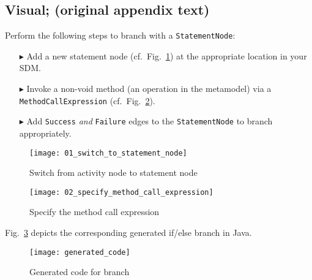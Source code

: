 \clearpage
\hypertarget{conBran vis}{}
\subsection{Visual; (original appendix text)}
\visHeader

Perform the following steps to branch with a \texttt{StatementNode}:
\begin{enumerate}
\item[$\blacktriangleright$] Add a new statement node (cf.~Fig.~\ref{fig:cond_statement_node}) at the appropriate location in your SDM.
\item[$\blacktriangleright$] Invoke a non-void method (an operation in the metamodel) via a \texttt{MethodCallExpression} (cf.~Fig.~\ref{fig:cond_method_call}).
\item[$\blacktriangleright$] Add \texttt{Success} \emph{and} \texttt{Failure} edges to the \texttt{StatementNode} to branch appropriately.
\end{enumerate}

\begin{figure}[htp]
\begin{center}
  \texttt{[image: 01\_switch\_to\_statement\_node]}
  \caption{Switch from activity node to statement node}
  \label{fig:cond_statement_node}
\end{center}
\end{figure}

\begin{figure}[htp]
\begin{center}
  \texttt{[image: 02\_specify\_method\_call\_expression]}
  \caption{Specify the method call expression}
  \label{fig:cond_method_call}
\end{center}
\end{figure}

Fig.~\ref{fig:cond_branch_on_op_code} depicts the corresponding generated if/else branch in Java.

\begin{figure}[htp]
\begin{center}
  \texttt{[image: generated\_code]}
  \caption{Generated code for branch}
  \label{fig:cond_branch_on_op_code}
\end{center}
\end{figure}

